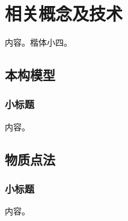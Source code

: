 \chapter{相关概念及技术} \label{chap:background}
内容。楷体小四。


\section{本构模型}\label{sect:background:constitutive_model}
\subsection{小标题}
内容\cite{rack-scale-join}。


\section{物质点法}
\subsection{小标题}
内容。